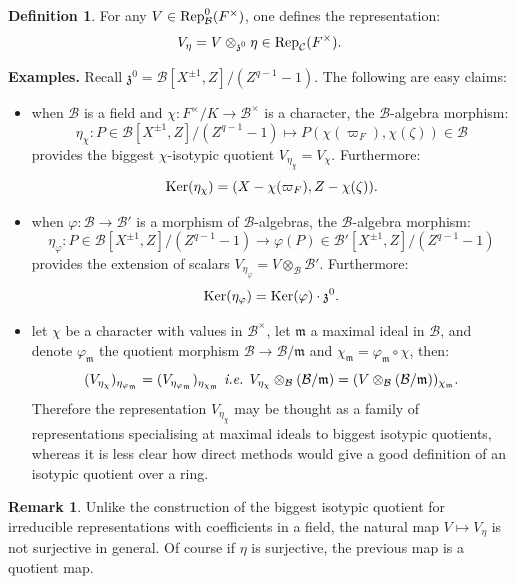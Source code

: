 \documentclass[11pt]{article}
\theoremstyle{plain}
\theoremstyle{definition}
\newtheorem{defi}[theo]{Definition}
\newtheorem{rem}[theo]{Remark}
\theoremstyle{plain}
\theoremstyle{definition}
\theoremstyle{plain}
\begin{document}
\begin{defi} For any $V \in \textup{Rep}_\mathcal{B}^0(F^\times)$, one defines the representation:
$$V_\eta = V \otimes_{\mathfrak{z}^0} \eta \in \textup{Rep}_\mathcal{C}(F^\times).$$ \end{defi}

\noindent \textbf{Examples.} Recall $\mathfrak{z}^0 = \mathcal{B}[X^{\pm 1},Z]/(Z^{q-1}-1)$. The following are easy claims:
\begin{itemize}
\item when $\mathcal{B}$ is a field and $\chi : F^\times/K \to \mathcal{B}^\times$ is a character, the $\mathcal{B}$-algebra morphism:
$$\eta_\chi : P \in \mathcal{B}[X^{\pm 1},Z]/(Z^{q-1}-1) \mapsto P(\chi(\varpi_F),\chi(\zeta)) \in \mathcal{B}$$
provides the biggest $\chi$-isotypic quotient $V_{\eta_\chi} = V_\chi$. Furthermore:
$$\textup{Ker}(\eta_\chi) = (X- \chi(\varpi_F),Z-\chi(\zeta)).$$
\item when $\varphi : \mathcal{B} \to \mathcal{B}'$ is a morphism of $\mathcal{B}$-algebras, the $\mathcal{B}$-algebra morphism:
$$\eta_\varphi : P \in \mathcal{B}[X^{\pm 1},Z]/(Z^{q-1}-1) \to \varphi(P) \in \mathcal{B}'[X^{\pm 1},Z]/(Z^{q-1}-1)$$
provides the extension of scalars $V_{\eta_\varphi} = V \otimes_{\mathcal{B}} \mathcal{B}'$. Furthermore:
$$\textup{Ker}(\eta_\varphi)=\textup{Ker}(\varphi) \cdot \mathfrak{z}^0.$$
\item let $\chi$ be a character with values in $\mathcal{B}^\times$, let $\mathfrak{m}$ a maximal ideal in $\mathcal{B}$, and denote $\varphi_\mathfrak{m}$ the quotient morphism $\mathcal{B} \to \mathcal{B}/\mathfrak{m}$ and $\chi_\mathfrak{m}=\varphi_\mathfrak{m} \circ \chi$, then: 
$$(V_{\eta_\chi})_{\eta_{\varphi_\mathfrak{m}}} = (V_{\eta_{\varphi_\mathfrak{m}}})_{\eta_{\chi_\mathfrak{m}}} \textup{ \textit{i.e.} } V_{\eta_\chi} \otimes_{\mathcal{B}} (\mathcal{B} / \mathfrak{m}) = (V \otimes_\mathcal{B} (\mathcal{B} / \mathfrak{m}) )_{\chi_\mathfrak{m}}.$$
Therefore the representation $V_{\eta_\chi}$ may be thought as a family of representations specialising at maximal ideals to biggest isotypic quotients, whereas it is less clear how direct methods would give a good definition of an isotypic quotient over a ring.
\end{itemize}

\begin{rem} Unlike the construction of the biggest isotypic quotient for irreducible representations with coefficients in a field, the natural map $V \mapsto V_\eta$ is not surjective in general. Of course if $\eta$ is surjective, the previous map is a quotient map. \end{rem}
\end{document}
